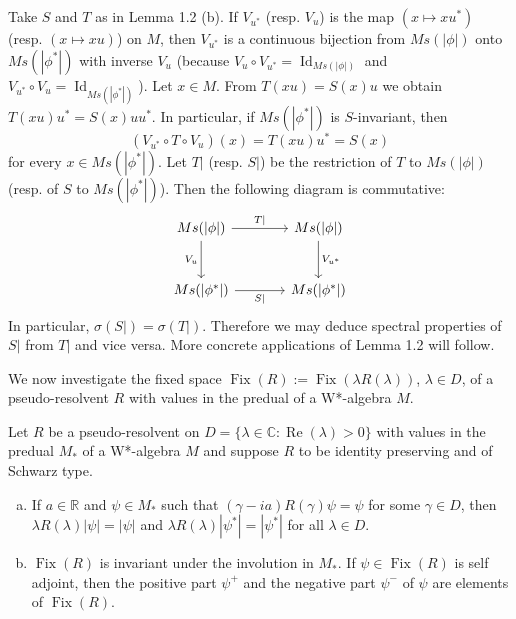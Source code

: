 
\begin{remark}\label{rem:1.3}
Take $S$ and $T$ as in Lemma 1.2 (b).
If $V_{u^*}$ (resp. $V_u$) is the map $(x \mapsto xu^*)$ (resp. $(x \mapsto xu)$) on $M$, then $V_{u^*}$ is a continuous bijection from $Ms(|\phi|)$ onto $Ms(|\phi^*|)$ with inverse $V_u$ (because $V_u \circ V_{u^*} = \operatorname{Id}_{Ms(|\phi|)}$ and $V_{u^*} \circ V_u = \operatorname{Id}_{Ms(|\phi^*|)}$).
Let $x \in M$.
From $T(xu) = S(x)u$ we obtain $T(xu)u^* = S(x)uu^*$.
In particular, if $Ms(|\phi^*|)$ is $S$-invariant, then
\[
(V_{u^*} \circ T \circ V_u)(x) = T(xu)u^* = S(x)
\]
for every $x \in Ms(|\phi^*|)$.
Let $T|$ (resp. $S|$) be the restriction of $T$ to $Ms(|\phi|)$ (resp. of $S$ to $Ms(|\phi^*|)$).
Then the following diagram is commutative:
\begin{equation*}
\begin{tikzcd}[column sep=large, row sep=large, scale=1.5]
Ms(|\phi|) \arrow[r, "T|"] \arrow[d, "V_u"'] & Ms(|\phi|) \arrow[d, "V_{u^*}"] \\
Ms(|\phi^*|) \arrow[r, "S|"'] & Ms(|\phi^*|)
\end{tikzcd}
\end{equation*}
In particular, $\sigma(S|) = \sigma(T|)$.
Therefore we may deduce spectral properties of $S|$ from $T|$ and vice versa.
More concrete applications of Lemma 1.2 will follow.
\end{remark}
We now investigate the fixed space $\operatorname{Fix}(R) := \operatorname{Fix}(\lambda R(\lambda))$, $\lambda \in D$, of a pseudo-resolvent $R$ with values in the predual of a W*-algebra $M$.

\begin{proposition}\label{prop:1.4}
Let $R$ be a pseudo-resolvent on $D = \{\lambda \in \mathbb{C}: \operatorname{Re}(\lambda) > 0\}$ with values in the predual $M_*$ of a W*-algebra $M$ and suppose $R$ to be identity preserving and of Schwarz type.

\begin{enumerate}[(a)]
\item 
If $a \in \mathbb{R}$ and $\psi \in M_*$ such that $(\gamma - ia)R(\gamma)\psi = \psi$ for some $\gamma \in D$, then $\lambda R(\lambda)|\psi| = |\psi|$ and $\lambda R(\lambda)|\psi^*| = |\psi^*|$ for all $\lambda \in D$.

\item 
$\operatorname{Fix}(R)$ is invariant under the involution in $M_*$.
If $\psi \in \operatorname{Fix}(R)$ is self adjoint, then the positive part $\psi^+$ and the negative part $\psi^-$ of $\psi$ are elements of $\operatorname{Fix}(R)$.
\end{enumerate}
\end{proposition}

